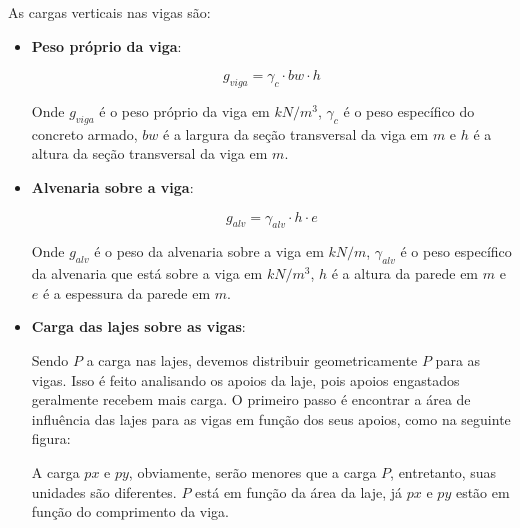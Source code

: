 As cargas verticais nas vigas são:

\begin{itemize}
	\item \textbf{Peso próprio da viga}:

		$$g_{viga}=\gamma_c\cdot bw\cdot h$$

		Onde $g_{viga}$ é o peso próprio da viga em $kN/m^3$, $\gamma_c$ é o peso específico do concreto armado, $bw$ é a largura da seção transversal da viga em $m$ e $h$ é a altura da seção transversal da viga em $m$.

	\item \textbf{Alvenaria sobre a viga}:

		$$g_{alv}=\gamma_{alv}\cdot h\cdot e$$

		Onde $g_{alv}$ é o peso da alvenaria sobre a viga em $kN/m$, $\gamma_{alv}$ é o peso específico da alvenaria que está sobre a viga em $kN/m^3$, $h$ é a altura da parede em $m$ e $e$ é a espessura da parede em $m$.

	\item \textbf{Carga das lajes sobre as vigas}:

		Sendo $P$ a carga nas lajes, devemos distribuir geometricamente $P$ para as vigas. Isso é feito analisando os apoios da laje, pois apoios engastados geralmente recebem mais carga. O primeiro passo é encontrar a área de influência das lajes para as vigas em função dos seus apoios, como na seguinte figura:

	A carga $px$ e $py$, obviamente, serão menores que a carga $P$, entretanto, suas unidades são diferentes. $P$ está em função da área da laje, já $px$ e $py$ estão em função do comprimento da viga.


\end{itemize}